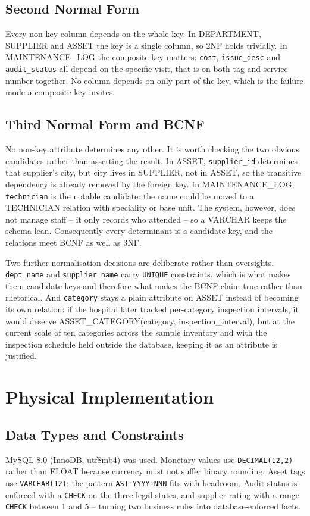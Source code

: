 \documentclass[conference,9pt]{IEEEtran}
\begin{document}
\subsection{Second Normal Form}
Every non-key column depends on the whole key. In DEPARTMENT, SUPPLIER and
ASSET the key is a single column, so 2NF holds trivially. In
MAINTENANCE\_LOG the composite key matters: \texttt{cost}, \texttt{issue\_desc}
and \texttt{audit\_status} all depend on the specific visit, that is on both
tag and service number together. No column depends on only part of the key,
which is the failure mode a composite key invites.

\subsection{Third Normal Form and BCNF}
No non-key attribute determines any other. It is worth checking the two
obvious candidates rather than asserting the result. In ASSET,
\texttt{supplier\_id} determines that supplier's city, but city lives in
SUPPLIER, not in ASSET, so the transitive dependency is already removed by the
foreign key. In MAINTENANCE\_LOG, \texttt{technician} is the notable candidate:
the name could be moved to a TECHNICIAN relation with speciality or base unit.
The system, however, does not manage staff -- it only records who attended --
so a VARCHAR keeps the schema lean. Consequently every determinant is a
candidate key, and the relations meet BCNF as well as 3NF.

Two further normalisation decisions are deliberate rather than oversights.
\texttt{dept\_name} and \texttt{supplier\_name} carry \texttt{UNIQUE}
constraints, which is what makes them candidate keys and therefore what makes
the BCNF claim true rather than rhetorical. And \texttt{category} stays a plain
attribute on ASSET instead of becoming its own relation: if the hospital later
tracked per-category inspection intervals, it would deserve
ASSET\_CATEGORY(category, inspection\_interval), but at the current scale of
ten categories across the sample inventory and with the inspection schedule
held outside the database, keeping it as an attribute is justified.

\section{Physical Implementation}
\subsection{Data Types and Constraints}
MySQL 8.0 (InnoDB, utf8mb4) was used. Monetary values use
\texttt{DECIMAL(12,2)} rather than FLOAT because currency must not suffer
binary rounding. Asset tags use \texttt{VARCHAR(12)}: the pattern
\texttt{AST-YYYY-NNN} fits with headroom. Audit status is enforced with a
\texttt{CHECK} on the three legal states, and supplier rating with a range
\texttt{CHECK} between 1 and 5 -- turning two business rules into
database-enforced facts.
\end{document}

